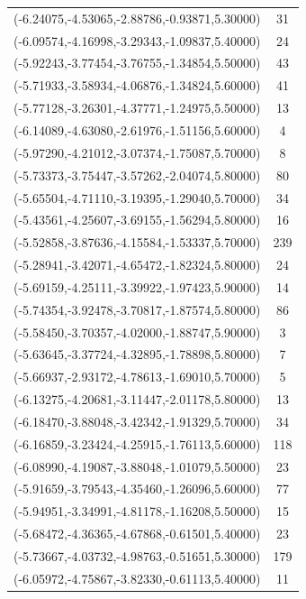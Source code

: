 \documentclass[12pt, fullpage,letterpaper]{article}
\begin{document}
\begin{longtable}{c|c}
(-6.24075,-4.53065,-2.88786,-0.93871,5.30000) & 31 \\
(-6.09574,-4.16998,-3.29343,-1.09837,5.40000) & 24 \\
(-5.92243,-3.77454,-3.76755,-1.34854,5.50000) & 43 \\
(-5.71933,-3.58934,-4.06876,-1.34824,5.60000) & 41 \\
(-5.77128,-3.26301,-4.37771,-1.24975,5.50000) & 13 \\
(-6.14089,-4.63080,-2.61976,-1.51156,5.60000) & 4 \\
(-5.97290,-4.21012,-3.07374,-1.75087,5.70000) & 8 \\
(-5.73373,-3.75447,-3.57262,-2.04074,5.80000) & 80 \\
(-5.65504,-4.71110,-3.19395,-1.29040,5.70000) & 34 \\
(-5.43561,-4.25607,-3.69155,-1.56294,5.80000) & 16 \\
(-5.52858,-3.87636,-4.15584,-1.53337,5.70000) & 239 \\
(-5.28941,-3.42071,-4.65472,-1.82324,5.80000) & 24 \\
(-5.69159,-4.25111,-3.39922,-1.97423,5.90000) & 14 \\
(-5.74354,-3.92478,-3.70817,-1.87574,5.80000) & 86 \\
(-5.58450,-3.70357,-4.02000,-1.88747,5.90000) & 3 \\
(-5.63645,-3.37724,-4.32895,-1.78898,5.80000) & 7 \\
(-5.66937,-2.93172,-4.78613,-1.69010,5.70000) & 5 \\
(-6.13275,-4.20681,-3.11447,-2.01178,5.80000) & 13 \\
(-6.18470,-3.88048,-3.42342,-1.91329,5.70000) & 34 \\
(-6.16859,-3.23424,-4.25915,-1.76113,5.60000) & 118 \\
(-6.08990,-4.19087,-3.88048,-1.01079,5.50000) & 23 \\
(-5.91659,-3.79543,-4.35460,-1.26096,5.60000) & 77 \\
(-5.94951,-3.34991,-4.81178,-1.16208,5.50000) & 15 \\
(-5.68472,-4.36365,-4.67868,-0.61501,5.40000) & 23 \\
(-5.73667,-4.03732,-4.98763,-0.51651,5.30000) & 179 \\
(-6.05972,-4.75867,-3.82330,-0.61113,5.40000) & 11 \\
\end{longtable}
\end{document}
